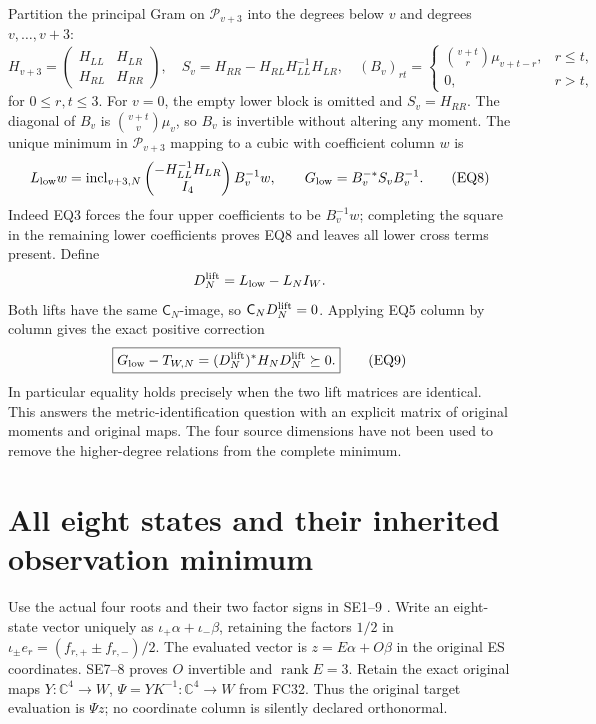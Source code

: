 \documentclass[11pt]{article}
\newcommand{\C}{\mathbb C}
\newcommand{\Pp}{\mathcal P}
\newcommand{\rank}{\operatorname{rank}}
\begin{document}
Partition the principal Gram on $\Pp_{v+3}$ into the degrees below
$v$ and degrees $v,\ldots,v+3$:
\[
 H_{v+3}=\begin{pmatrix}H_{LL}&H_{LR}\\H_{RL}&H_{RR}\end{pmatrix},
 \quad S_v=H_{RR}-H_{RL}H_{LL}^{-1}H_{LR},
 \quad (B_v)_{rt}=\begin{cases}\binom{v+t}{r}\mu_{v+t-r},&r\le t,\\
 0,&r>t,\end{cases}                                                \tag{EQ7}
\]
for $0\le r,t\le3$. For $v=0$, the empty lower block is omitted
and $S_v=H_{RR}$. The diagonal of $B_v$ is
$\binom{v+t}{v}\mu_v$, so $B_v$ is invertible without altering
any moment. The unique minimum in $\Pp_{v+3}$ mapping to a cubic
with coefficient column $w$ is
\[
 L_{\rm low}w=\operatorname{incl}_{v+3,N}
 \begin{pmatrix}-H_{LL}^{-1}H_{LR}\\I_4\end{pmatrix}B_v^{-1}w,
 \qquad G_{\rm low}=B_v^{-*}S_vB_v^{-1}.                            \tag{EQ8}
\]
Indeed EQ3 forces the four upper coefficients to be $B_v^{-1}w$;
completing the square in the remaining lower coefficients proves
EQ8 and leaves all lower cross terms present. Define
\[
 D_N^{\rm lift}=L_{\rm low}-L_NI_W.
\]
Both lifts have the same $\mathsf C_N$-image, so
$\mathsf C_ND_N^{\rm lift}=0$. Applying EQ5 column by column gives
the exact positive correction
\[
 \boxed{G_{\rm low}-T_{W,N}
       =(D_N^{\rm lift})^*H_ND_N^{\rm lift}\succeq0.}                \tag{EQ9}
\]
In particular equality holds precisely when the two lift matrices
are identical. This answers the metric-identification question with
an explicit matrix of original moments and original maps. The four
source dimensions have not been used to remove the higher-degree
relations from the complete minimum.

\section{All eight states and their inherited observation minimum}
Use the actual four roots and their two factor signs in SE1--9
\cite{FC}. Write an eight-state vector uniquely as
$\iota_+\alpha+\iota_-\beta$, retaining the factors $1/2$ in
$\iota_\pm e_r=(f_{r,+}\pm f_{r,-})/2$. The evaluated vector is
$z=E\alpha+O\beta$ in the original ES coordinates. SE7--8 proves
$O$ invertible and $\rank E=3$. Retain the exact original maps
$Y:\C^4\to W$, $\Psi=YK^{-1}:\C^4\to W$ from FC32.
Thus the original target evaluation is $\Psi z$; no coordinate
column is silently declared orthonormal.
\end{document}
